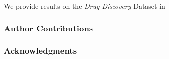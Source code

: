\documentclass{article} %
\begin{document}
	We provide results on the \textit{Drug Discovery} Dataset in \cite{DiakonikolasKKLSS19}
	
	
	\subsubsection*{Author Contributions}
	
	\subsubsection*{Acknowledgments}	

	
	
	
\end{document}
